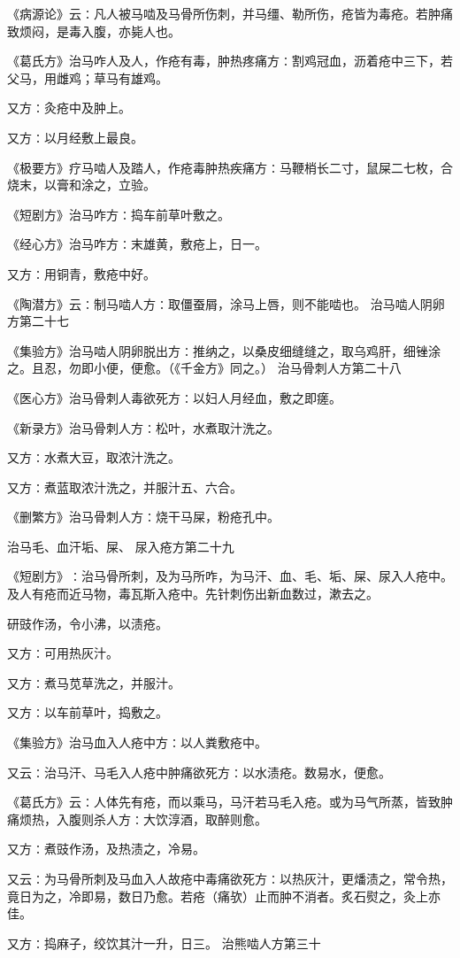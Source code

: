 \documentclass[a4paper,12pt,UTF8,twoside]{ctexbook}
\begin{document}
《病源论》云∶凡人被马啮及马骨所伤刺，并马缰、勒所伤，疮皆为毒疮。若肿痛致烦闷，是毒入腹，亦毙人也。

《葛氏方》治马咋人及人，作疮有毒，肿热疼痛方∶割鸡冠血，沥着疮中三下，若父马，用雌鸡；草马有雄鸡。

又方∶灸疮中及肿上。

又方∶以月经敷上最良。

《极要方》疗马啮人及踏人，作疮毒肿热疾痛方∶马鞭梢长二寸，鼠屎二七枚，合烧末，以膏和涂之，立验。

《短剧方》治马咋方∶捣车前草叶敷之。

《经心方》治马咋方∶末雄黄，敷疮上，日一。

又方∶用铜青，敷疮中好。

《陶潜方》云∶制马啮人方∶取僵蚕屑，涂马上唇，则不能啮也。
治马啮人阴卵方第二十七

《集验方》治马啮人阴卵脱出方∶推纳之，以桑皮细缝缝之，取乌鸡肝，细锉涂之。且忍，勿即小便，便愈。（《千金方》同之。）
治马骨刺人方第二十八

《医心方》治马骨刺人毒欲死方∶以妇人月经血，敷之即瘥。

《新录方》治马骨刺人方∶松叶，水煮取汁洗之。

又方∶水煮大豆，取浓汁洗之。

又方∶煮蓝取浓汁洗之，并服汁五、六合。

《删繁方》治马骨刺人方∶烧干马屎，粉疮孔中。

治马毛、血汗垢、屎、
尿入疮方第二十九

《短剧方》∶治马骨所刺，及为马所咋，为马汗、血、毛、垢、屎、尿入人疮中。及人有疮而近马物，毒瓦斯入疮中。先针刺伤出新血数过，漱去之。

研豉作汤，令小沸，以渍疮。

又方∶可用热灰汁。

又方∶煮马苋草洗之，并服汁。

又方∶以车前草叶，捣敷之。

《集验方》治马血入人疮中方∶以人粪敷疮中。

又云∶治马汗、马毛入人疮中肿痛欲死方∶以水渍疮。数易水，便愈。

《葛氏方》云∶人体先有疮，而以乘马，马汗若马毛入疮。或为马气所蒸，皆致肿痛烦热，入腹则杀人方∶大饮淳酒，取醉则愈。

又方∶煮豉作汤，及热渍之，冷易。

又云∶为马骨所刺及马血入人故疮中毒痛欲死方∶以热灰汁，更燔渍之，常令热，竟日为之，冷即易，数日乃愈。若疮（痛欤）止而肿不消者。炙石熨之，灸上亦佳。

又方∶捣麻子，绞饮其汁一升，日三。
治熊啮人方第三十
\end{document}
